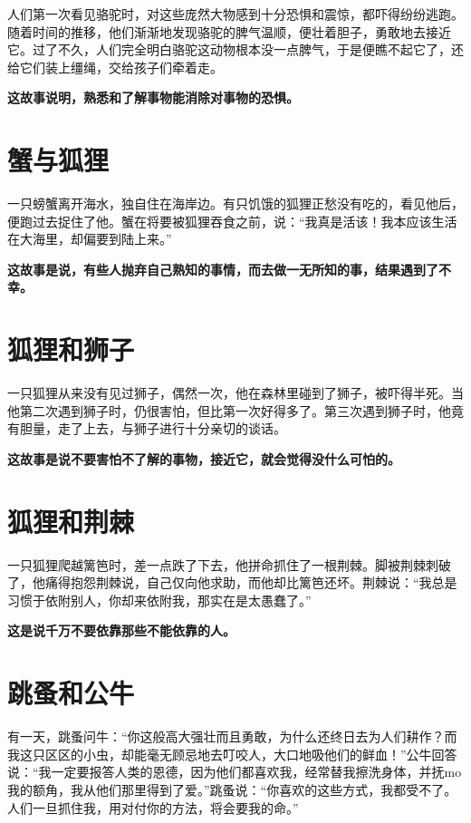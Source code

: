 人们第一次看见骆驼时，对这些庞然大物感到十分恐惧和震惊，都吓得纷纷逃跑。随着时间的推移，他们渐渐地发现骆驼的脾气温顺，便壮着胆子，勇敢地去接近它。过了不久，人们完全明白骆驼这动物根本没一点脾气，于是便瞧不起它了，还给它们装上缰绳，交给孩子们牵着走。

{\bfseries \color{red}这故事说明，熟悉和了解事物能消除对事物的恐惧。}

\section{蟹与狐狸}

一只螃蟹离开海水，独自住在海岸边。有只饥饿的狐狸正愁没有吃的，看见他后，便跑过去捉住了他。蟹在将要被狐狸吞食之前，说：“我真是活该！我本应该生活在大海里，却偏要到陆上来。”

{\bfseries \color{red}这故事是说，有些人抛弃自己熟知的事情，而去做一无所知的事，结果遇到了不幸。}

\section{狐狸和狮子}

一只狐狸从来没有见过狮子，偶然一次，他在森林里碰到了狮子，被吓得半死。当他第二次遇到狮子时，仍很害怕，但比第一次好得多了。第三次遇到狮子时，他竟有胆量，走了上去，与狮子进行十分亲切的谈话。

{\bfseries \color{red}这故事是说不要害怕不了解的事物，接近它，就会觉得没什么可怕的。}

\section{狐狸和荆棘}

一只狐狸爬越篱笆时，差一点跌了下去，他拼命抓住了一根荆棘。脚被荆棘刺破了，他痛得抱怨荆棘说，自己仅向他求助，而他却比篱笆还坏。荆棘说：“我总是习惯于依附别人，你却来依附我，那实在是太愚蠢了。”

{\bfseries \color{red}这是说千万不要依靠那些不能依靠的人。}

\section{跳蚤和公牛}

有一天，跳蚤问牛：“你这般高大强壮而且勇敢，为什么还终日去为人们耕作？而我这只区区的小虫，却能毫无顾忌地去叮咬人，大口地吸他们的鲜血！”公牛回答说：“我一定要报答人类的恩德，因为他们都喜欢我，经常替我擦洗身体，并抚mo我的额角，我从他们那里得到了爱。”跳蚤说：“你喜欢的这些方式，我都受不了。人们一旦抓住我，用对付你的方法，将会要我的命。”

